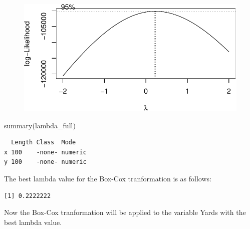 \documentclass[
  super,
  preprint,
  3p]{elsarticle}
\newenvironment{Shaded}{\begin{snugshade}}{\end{snugshade}}
\newcommand{\FunctionTok}[1]{\textcolor[rgb]{0.28,0.35,0.67}{#1}}
\newcommand{\NormalTok}[1]{\textcolor[rgb]{0.00,0.23,0.31}{#1}}
\newcommand{\SpecialCharTok}[1]{\textcolor[rgb]{0.37,0.37,0.37}{#1}}
\begin{document}
\begin{figure}[H]

{\centering \includegraphics{project_report_files/figure-pdf/unnamed-chunk-31-1.pdf}

}

\end{figure}

\begin{Shaded}
\begin{Highlighting}[]
\FunctionTok{summary}\NormalTok{(lambda\_full)}
\end{Highlighting}
\end{Shaded}

\begin{verbatim}
  Length Class  Mode   
x 100    -none- numeric
y 100    -none- numeric
\end{verbatim}

The best lambda value for the Box-Cox tranformation is as follows:

\begin{Shaded}
\end{Shaded}

\begin{verbatim}
[1] 0.2222222
\end{verbatim}

Now the Box-Cox tranformation will be applied to the variable Yards with
the best lambda value.
\end{document}
